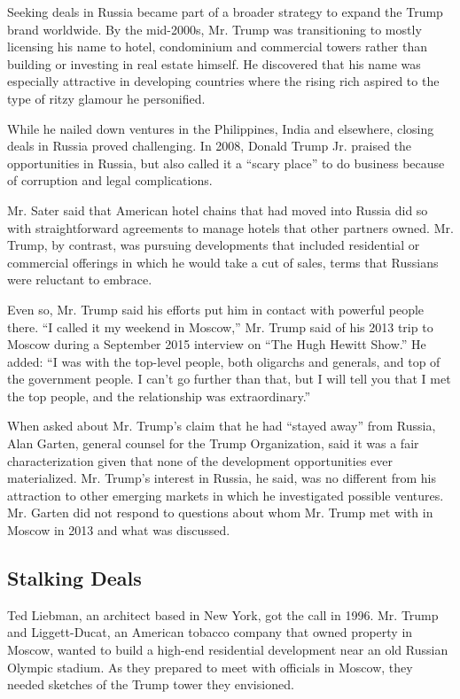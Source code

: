 Seeking deals in Russia became part of a broader strategy to expand the
Trump brand worldwide. By the mid-2000s, Mr. Trump was transitioning to
mostly licensing his name to hotel, condominium and commercial towers
rather than building or investing in real estate himself. He discovered
that his name was especially attractive in developing countries where
the rising rich aspired to the type of ritzy glamour he personified.

While he nailed down ventures in the Philippines, India and elsewhere,
closing deals in Russia proved challenging. In 2008, Donald Trump Jr.
praised the opportunities in Russia, but also called it a ``scary
place'' to do business because of corruption and legal complications.

Mr. Sater said that American hotel chains that had moved into Russia did
so with straightforward agreements to manage hotels that other partners
owned. Mr. Trump, by contrast, was pursuing developments that included
residential or commercial offerings in which he would take a cut of
sales, terms that Russians were reluctant to embrace.

Even so, Mr. Trump said his efforts put him in contact with powerful
people there. ``I called it my weekend in Moscow,'' Mr. Trump said of
his 2013 trip to Moscow during a September 2015 interview on ``The Hugh
Hewitt Show.'' He added: ``I was with the top-level people, both
oligarchs and generals, and top of the government people. I can't go
further than that, but I will tell you that I met the top people, and
the relationship was extraordinary.''

When asked about Mr. Trump's claim that he had ``stayed away'' from
Russia, Alan Garten, general counsel for the Trump Organization, said it
was a fair characterization given that none of the development
opportunities ever materialized. Mr. Trump's interest in Russia, he
said, was no different from his attraction to other emerging markets in
which he investigated possible ventures. Mr. Garten did not respond to
questions about whom Mr. Trump met with in Moscow in 2013 and what was
discussed.

\hypertarget{stalking-deals}{%
\subsection{Stalking Deals}\label{stalking-deals}}

Ted Liebman, an architect based in New York, got the call in 1996. Mr.
Trump and Liggett-Ducat, an American tobacco company that owned property
in Moscow, wanted to build a high-end residential development near an
old Russian Olympic stadium. As they prepared to meet with officials in
Moscow, they needed sketches of the Trump tower they envisioned.

